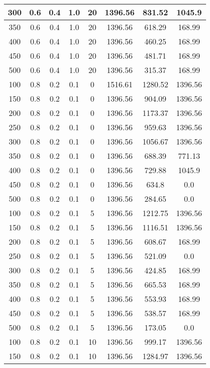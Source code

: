 \documentclass[a4paper, 12pt]{extreport}
\begin{document}
\begin{itemize}
\begin{longtable}{|c|c|c|c|c|c|c|c|}
			300 & 0.6 & 0.4 & 1.0 & 20 & 1396.56 & 831.52 & 1045.9 \\\hline
			350 & 0.6 & 0.4 & 1.0 & 20 & 1396.56 & 618.29 & 168.99 \\\hline
			400 & 0.6 & 0.4 & 1.0 & 20 & 1396.56 & 460.25 & 168.99 \\\hline
			450 & 0.6 & 0.4 & 1.0 & 20 & 1396.56 & 481.71 & 168.99 \\\hline
			500 & 0.6 & 0.4 & 1.0 & 20 & 1396.56 & 315.37 & 168.99 \\\hline
			100 & 0.8 & 0.2 & 0.1 & 0 & 1516.61 & 1280.52 & 1396.56 \\\hline
			150 & 0.8 & 0.2 & 0.1 & 0 & 1396.56 & 904.09 & 1396.56 \\\hline
			200 & 0.8 & 0.2 & 0.1 & 0 & 1396.56 & 1173.37 & 1396.56 \\\hline
			250 & 0.8 & 0.2 & 0.1 & 0 & 1396.56 & 959.63 & 1396.56 \\\hline
			300 & 0.8 & 0.2 & 0.1 & 0 & 1396.56 & 1056.67 & 1396.56 \\\hline
			350 & 0.8 & 0.2 & 0.1 & 0 & 1396.56 & 688.39 & 771.13 \\\hline
			400 & 0.8 & 0.2 & 0.1 & 0 & 1396.56 & 729.88 & 1045.9 \\\hline
			450 & 0.8 & 0.2 & 0.1 & 0 & 1396.56 & 634.8 & 0.0 \\\hline
			500 & 0.8 & 0.2 & 0.1 & 0 & 1396.56 & 284.65 & 0.0 \\\hline
			100 & 0.8 & 0.2 & 0.1 & 5 & 1396.56 & 1212.75 & 1396.56 \\\hline
			150 & 0.8 & 0.2 & 0.1 & 5 & 1396.56 & 1116.51 & 1396.56 \\\hline
			200 & 0.8 & 0.2 & 0.1 & 5 & 1396.56 & 608.67 & 168.99 \\\hline
			250 & 0.8 & 0.2 & 0.1 & 5 & 1396.56 & 521.09 & 0.0 \\\hline
			300 & 0.8 & 0.2 & 0.1 & 5 & 1396.56 & 424.85 & 168.99 \\\hline
			350 & 0.8 & 0.2 & 0.1 & 5 & 1396.56 & 665.53 & 168.99 \\\hline
			400 & 0.8 & 0.2 & 0.1 & 5 & 1396.56 & 553.93 & 168.99 \\\hline
			450 & 0.8 & 0.2 & 0.1 & 5 & 1396.56 & 538.57 & 168.99 \\\hline
			500 & 0.8 & 0.2 & 0.1 & 5 & 1396.56 & 173.05 & 0.0 \\\hline
			100 & 0.8 & 0.2 & 0.1 & 10 & 1396.56 & 999.17 & 1396.56 \\\hline
			150 & 0.8 & 0.2 & 0.1 & 10 & 1396.56 & 1284.97 & 1396.56 \\\hline

\end{longtable}
\end{itemize}
\end{document}
